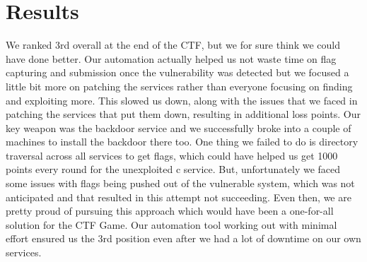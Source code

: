 \documentclass[12pt]{report}
\begin{document}
\section*{Results}
We ranked 3rd overall at the end of the CTF, but we for sure think we could have done better. Our automation actually helped us not waste time on flag capturing and submission once the vulnerability was detected but we focused a little bit more on patching the services rather than everyone focusing on finding and exploiting more. This slowed us down, along with the issues that we faced in patching the services that put them down, resulting in additional loss points. Our key weapon was the backdoor service and we successfully broke into a couple of machines to install the backdoor there too. One thing we failed to do is directory traversal across all services to get flags, which could have helped us get 1000 points every round for the unexploited c service. But, unfortunately we faced some issues with flags being pushed out of the vulnerable system, which was not anticipated and that resulted in this attempt not succeeding. Even then, we are pretty proud of pursuing this approach which would have been a one-for-all solution for the CTF Game. Our automation tool working out with minimal effort ensured us the 3rd position even after we had a lot of downtime on our own services.

\end{document}
